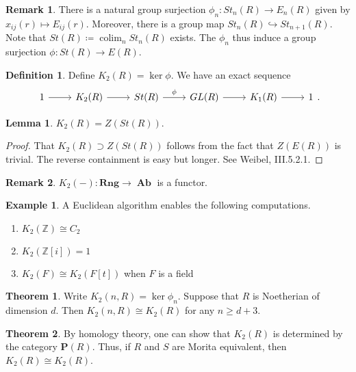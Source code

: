 \documentclass[10pt,letterpaper,cm]{nupset}
\theoremstyle{definition}
\newtheorem*{definition}{Definition}
\newtheorem{exmp}{Example}
\newtheorem{remark}{Remark}
\newtheorem{theorem}{Theorem}
\newtheorem{lemma}{Lemma}
\renewcommand{\P}{\mathbf P}
\newcommand{\Z}{\mathbb Z}
\newcommand{\1}{\mathbf{1}}
\newcommand{\0}{\vec 0}
\DeclareMathOperator{\colim}{colim}
\DeclareMathOperator{\Ab}{\mathbf{Ab}}
\begin{document}
\begin{remark}
There is a natural group surjection $\phi_n : St_n(R) \to E_n(R)$ given by $x_{ij}(r) \mapsto E_{ij}(r)$. Moreover, there is a group map $St_n(R) \hookrightarrow St_{n+1}(R)$. Note that $St(R)\coloneqq \colim_n St_n(R)$ exists. The $\phi_n$ thus induce a group surjection $\phi : St(R) \to E(R)$.
\end{remark}

\begin{definition}
Define $K_2(R)  = \ker \phi$. We have an exact sequence
\[
\begin{tikzcd}
1 \arrow[r] & K_2(R) \arrow[r] & St(R) \arrow[r, "\phi"] & GL(R) \arrow[r] & K_1(R) \arrow[r] & 1
\end{tikzcd}.
\]
\end{definition}

\begin{lemma}
$K_2(R) = Z(St(R))$.
\end{lemma}
\begin{proof}
That $K_2(R) \supset Z(St(R))$ follows from the fact that $Z(E(R))$ is trivial. The reverse containment is easy but longer. See Weibel, III.5.2.1.
\end{proof}

\begin{remark}
$K_2(-) : \mathbf{Rng} \to \Ab$ is a functor.
\end{remark}

\begin{exmp} A Euclidean algorithm enables the following computations.
\begin{enumerate}
\item $K_2(\Z) \cong C_2$
\item $K_2(\Z[i]) =1$
\item $K_2(F) \cong K_2(F[t])$ when $F$ is a field
\end{enumerate}
\end{exmp}

\begin{theorem}
Write $K_2(n, R) = \ker \phi_n$. Suppose that $R$ is Noetherian of dimension $d$. Then $K_2(n, R) \cong K_2(R)$ for any $n\geq d +3$.
\end{theorem}

\begin{theorem}
By homology theory, one can show that $K_2(R)$ is determined by the category $\P(R)$. Thus, if $R$ and $S$ are Morita equivalent, then $K_2(R) \cong K_2(R)$.
\end{theorem}
\end{document}

